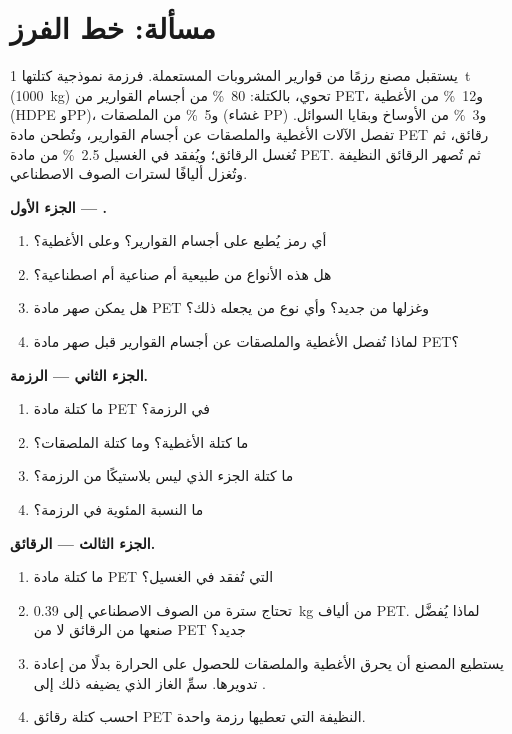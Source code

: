 \section{مسألة: خط الفرز}

\begin{problem}
\label{pb:g8:plastics:1}
يستقبل مصنع  رزمًا من قوارير المشروبات المستعملة. فرزمة نموذجية
كتلتها \qty{1}{t} (\qty{1000}{kg}) تحوي، بالكتلة: \qty{80}{\percent} من
أجسام القوارير من PET، و\qty{12}{\percent} من الأغطية (HDPE وPP)،
و\qty{5}{\percent} من الملصقات (غشاء PP) و\qty{3}{\percent} من الأوساخ
وبقايا السوائل. تفصل الآلات الأغطية والملصقات عن أجسام القوارير، وتُطحن مادة PET
رقائق، ثم تُغسل الرقائق؛ ويُفقد في الغسيل \qty{2.5}{\percent} من مادة PET.
ثم تُصهر الرقائق النظيفة وتُغزل أليافًا لسترات الصوف الاصطناعي.

\medskip
\noindent\textbf{الجزء الأول --- .}
\begin{enumerate}
  \item أي رمز يُطبع على أجسام القوارير؟ وعلى الأغطية؟
  \item هل هذه الأنواع من  طبيعية أم صناعية أم اصطناعية؟
  \item هل يمكن صهر مادة PET وغزلها من جديد؟ وأي نوع من  يجعله ذلك؟
  \item لماذا تُفصل الأغطية والملصقات عن أجسام القوارير قبل صهر
        مادة PET؟
\end{enumerate}

\medskip
\noindent\textbf{الجزء الثاني --- الرزمة.}
\begin{enumerate}[resume]
  \item ما كتلة مادة PET في الرزمة؟
  \item ما كتلة الأغطية؟ وما كتلة الملصقات؟
  \item ما كتلة الجزء الذي ليس بلاستيكًا من الرزمة؟
  \item ما النسبة المئوية  في الرزمة؟
\end{enumerate}

\medskip
\noindent\textbf{الجزء الثالث --- الرقائق.}
\begin{enumerate}[resume]
  \item ما كتلة مادة PET التي تُفقد في الغسيل؟
  \item تحتاج سترة من الصوف الاصطناعي إلى \qty{0.39}{kg} من ألياف PET. لماذا
        يُفضَّل صنعها من الرقائق لا من PET جديد؟
  \item يستطيع المصنع أن يحرق الأغطية والملصقات للحصول على الحرارة بدلًا من
        إعادة تدويرها. سمِّ الغاز الذي يضيفه ذلك إلى .
  \item احسب كتلة رقائق PET النظيفة التي تعطيها رزمة واحدة.
\end{enumerate}
\end{problem}
